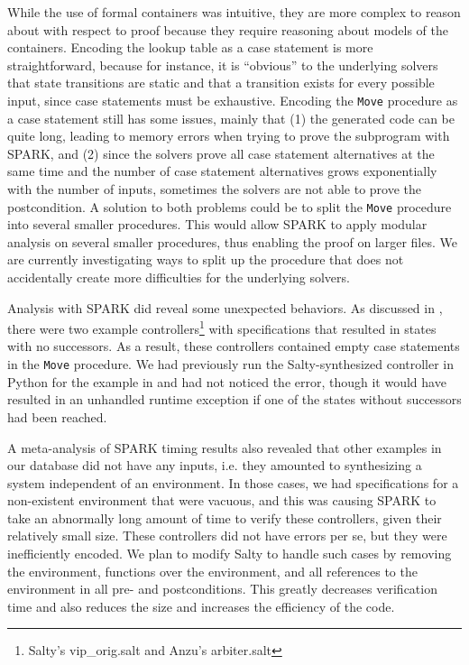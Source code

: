 \documentclass[runningheads]{llncs}
\begin{document}
While the use of formal containers was intuitive, they are more complex to reason about with respect to proof 
because they require reasoning about models of the containers. 
Encoding the lookup table as a case statement is more straightforward, because for instance, 
it is ``obvious'' to the underlying solvers that state transitions are static and that a transition exists for every possible input, since 
case statements must be exhaustive. 
Encoding the \lstinline{Move} procedure as a case statement still has some issues, mainly that 
(1) the generated code can be quite long, leading to memory errors when trying to prove the subprogram with SPARK, and
(2) since the solvers prove all case statement alternatives at the same time and the number of case statement alternatives grows 
exponentially with the number of inputs, sometimes the solvers are not able to prove the postcondition.
A solution to both problems could be to split the \lstinline{Move} procedure into several smaller procedures. %
This would allow SPARK to apply modular analysis on several smaller procedures, thus enabling the proof on larger files. 
We are currently investigating ways to split up the procedure that does not accidentally create more difficulties for the underlying solvers.

Analysis with SPARK did reveal some unexpected behaviors. 
As discussed in , there were two example controllers\footnote{Salty's vip\_orig.salt and Anzu's arbiter.salt} 
with specifications that resulted in states with no successors. 
As a result, these controllers contained empty case statements in the \lstinline{Move} procedure. 
We had previously run the Salty-synthesized controller in Python for the example in  and had not noticed the error, 
though it would have resulted in an unhandled runtime exception if one of the states without successors had been reached.  

A meta-analysis of SPARK timing results also revealed that other examples in our database did not have any inputs, 
i.e. they amounted to synthesizing a system independent of an environment. 
In those cases, we had specifications for a non-existent environment that were vacuous, 
and this was causing SPARK to take an abnormally long amount of time to verify these controllers, given their relatively small size. 
These controllers did not have errors per se, 
but they were inefficiently encoded. 
We plan to modify Salty to handle such cases by removing the environment, functions over the environment, and
all references to the environment in all pre- and postconditions.
This greatly decreases verification time and also reduces the size and increases the efficiency of the code.
\end{document}
